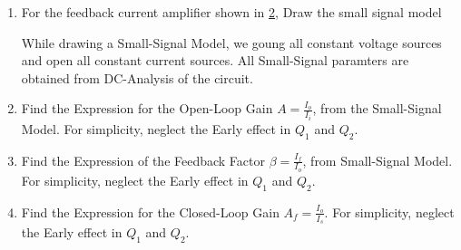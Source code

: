 \begin{enumerate}[label=\thesubsection.\arabic*.,ref=\thesubsection.\theenumi]

\item For the feedback current amplifier shown in \ref{fig:Input}, Draw the small signal model
\begin{figure}[h!]
	\begin{center}
		\resizebox{\columnwidth/2}{!}{}
	\end{center}
	\caption{}
	\label{fig:Input}
\end{figure}

\solution
While drawing a Small-Signal Model, we goung all constant voltage sources and open all constant current sources. All Small-Signal paramters are obtained from DC-Analysis of the circuit.
\begin{figure}[h!]
	\begin{center}
		\resizebox{\columnwidth/2}{!}{}
	\end{center}
	\caption{}
	\label{fig:Input}
\end{figure}
%
\item Find the Expression for the Open-Loop Gain $A=\frac{I_{o}}{I_{i}}$, from the Small-Signal Model. For simplicity, neglect the Early effect in $Q_{1}$ and $Q_{2}$.

\item Find the Expression of the Feedback Factor $\beta = \frac{I_{f}}{I_{o}}$, from Small-Signal Model. For simplicity, neglect the Early effect in $Q_{1}$ and $Q_{2}$.

\item Find the Expression for the Closed-Loop Gain $A_{f}=\frac{I_{o}}{I_{s}}$. For simplicity, neglect the Early effect in $Q_{1}$ and $Q_{2}$.
\end{enumerate}
